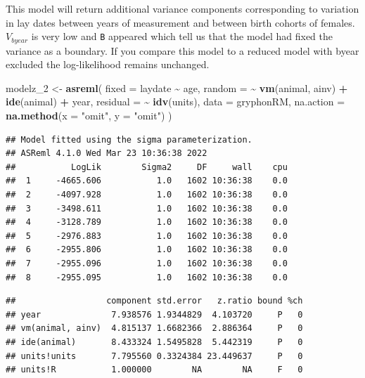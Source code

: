 \documentclass[
  12pt,
]{book}
\newenvironment{Shaded}{\begin{snugshade}}{\end{snugshade}}
\newcommand{\DataTypeTok}[1]{\textcolor[rgb]{0.13,0.29,0.53}{#1}}
\newcommand{\DecValTok}[1]{\textcolor[rgb]{0.00,0.00,0.81}{#1}}
\newcommand{\KeywordTok}[1]{\textcolor[rgb]{0.13,0.29,0.53}{\textbf{#1}}}
\newcommand{\NormalTok}[1]{#1}
\newcommand{\OperatorTok}[1]{\textcolor[rgb]{0.81,0.36,0.00}{\textbf{#1}}}
\newcommand{\StringTok}[1]{\textcolor[rgb]{0.31,0.60,0.02}{#1}}
\begin{document}
This model will return additional variance components corresponding to variation in lay dates between years of measurement and between birth cohorts of females. \(V_{byear}\) is very low and \texttt{B} appeared which tell us that the model had fixed the variance as a boundary. If you compare this model to a reduced model with byear excluded the log-likelihood remains unchanged.

\begin{Shaded}
\begin{Highlighting}[]
\NormalTok{modelz\_}\DecValTok{2}\NormalTok{ \textless{}{-}}\StringTok{ }\KeywordTok{asreml}\NormalTok{(}
  \DataTypeTok{fixed =}\NormalTok{ laydate }\OperatorTok{\textasciitilde{}}\StringTok{ }\NormalTok{age,}
  \DataTypeTok{random =} \OperatorTok{\textasciitilde{}}\StringTok{ }\KeywordTok{vm}\NormalTok{(animal, ainv) }\OperatorTok{+}\StringTok{ }\KeywordTok{ide}\NormalTok{(animal) }\OperatorTok{+}
\StringTok{    }\NormalTok{year,}
  \DataTypeTok{residual =} \OperatorTok{\textasciitilde{}}\StringTok{ }\KeywordTok{idv}\NormalTok{(units),}
  \DataTypeTok{data =}\NormalTok{ gryphonRM,}
  \DataTypeTok{na.action =} \KeywordTok{na.method}\NormalTok{(}\DataTypeTok{x =} \StringTok{"omit"}\NormalTok{, }\DataTypeTok{y =} \StringTok{"omit"}\NormalTok{)}
\NormalTok{)}
\end{Highlighting}
\end{Shaded}

\begin{verbatim}
## Model fitted using the sigma parameterization.
## ASReml 4.1.0 Wed Mar 23 10:36:38 2022
##           LogLik        Sigma2     DF     wall    cpu
##  1     -4665.606           1.0   1602 10:36:38    0.0
##  2     -4097.928           1.0   1602 10:36:38    0.0
##  3     -3498.611           1.0   1602 10:36:38    0.0
##  4     -3128.789           1.0   1602 10:36:38    0.0
##  5     -2976.883           1.0   1602 10:36:38    0.0
##  6     -2955.806           1.0   1602 10:36:38    0.0
##  7     -2955.096           1.0   1602 10:36:38    0.0
##  8     -2955.095           1.0   1602 10:36:38    0.0
\end{verbatim}

\begin{Shaded}
\end{Shaded}

\begin{verbatim}
##                  component std.error   z.ratio bound %ch
## year              7.938576 1.9344829  4.103720     P   0
## vm(animal, ainv)  4.815137 1.6682366  2.886364     P   0
## ide(animal)       8.433324 1.5495828  5.442319     P   0
## units!units       7.795560 0.3324384 23.449637     P   0
## units!R           1.000000        NA        NA     F   0
\end{verbatim}
\end{document}
